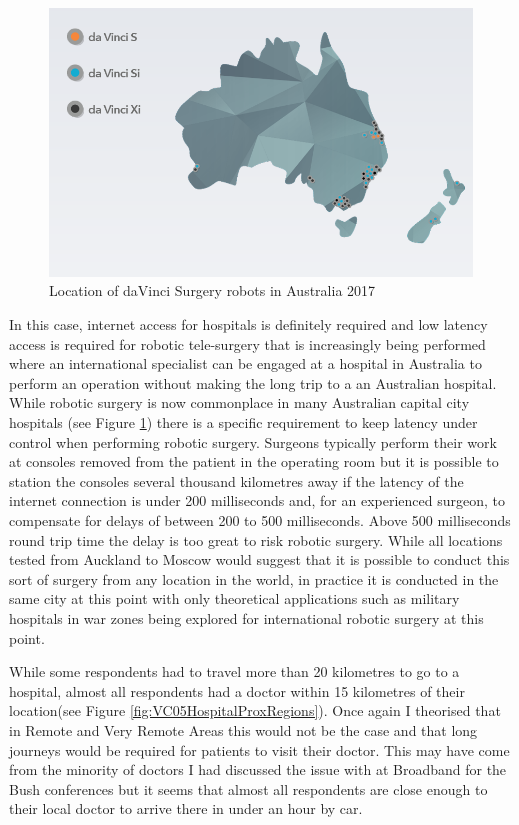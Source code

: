\begin{figure}
\centering
\includegraphics[scale=0.5]{figures/daVinciSurgery.png} 
\caption{Location of daVinci Surgery robots in Australia 2017\cite{RefWorks:374}} \label{fig:daVinciLocations}
\end{figure}
In this case, internet access for hospitals is definitely required and low latency access is required for robotic tele-surgery that is increasingly being performed where an international specialist can be engaged at a hospital in Australia to perform an operation without making the long trip to a an Australian hospital. While robotic surgery is now commonplace in many Australian capital city hospitals (see Figure \ref{fig:daVinciLocations}) there is a specific requirement to keep latency under control when performing robotic surgery. Surgeons typically perform their work at consoles removed from the patient in the operating room but it is possible to station the consoles several thousand kilometres away if the latency of the internet connection is under 200 milliseconds and, for an experienced surgeon, to compensate for delays of between 200 to 500 milliseconds. Above 500 milliseconds round trip time the delay is too great to risk robotic surgery. While all locations tested from Auckland to Moscow would suggest that it is possible to conduct this sort of surgery from any location in the world, in practice it is conducted in the same city at this point with only theoretical applications such as military hospitals in war zones being explored for international robotic surgery at this point\cite{RefWorks:373}.

While some respondents had to travel more than 20 kilometres to go to a hospital, almost all respondents had a doctor within 15 kilometres of their location(see Figure \ref{fig:VC05HospitalProxRegions}). Once again I theorised that in Remote and Very Remote Areas this would not be the case and that long journeys would be required for patients to visit their doctor. This may have come from the minority of doctors I had discussed the issue with at Broadband for the Bush conferences but it seems that almost all respondents are close enough to their local doctor to arrive there in under an hour by car.  

